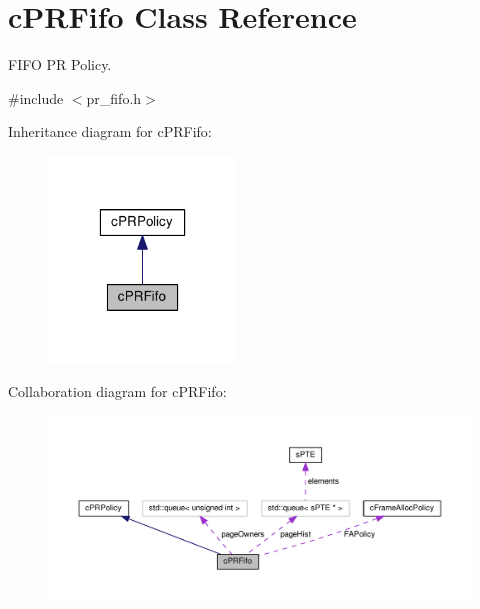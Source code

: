 \hypertarget{classcPRFifo}{\section{c\-P\-R\-Fifo \-Class \-Reference}
\label{db/d3a/classcPRFifo}
}


\-F\-I\-F\-O \-P\-R \-Policy.  




{\ttfamily \#include $<$pr\-\_\-fifo.\-h$>$}



\-Inheritance diagram for c\-P\-R\-Fifo\-:\nopagebreak
\begin{figure}[H]
\begin{center}
\leavevmode
\includegraphics[width=142pt]{d6/d49/classcPRFifo__inherit__graph}
\end{center}
\end{figure}


\-Collaboration diagram for c\-P\-R\-Fifo\-:\nopagebreak
\begin{figure}[H]
\begin{center}
\leavevmode
\includegraphics[width=350pt]{d9/d21/classcPRFifo__coll__graph}
\end{center}
\end{figure}
